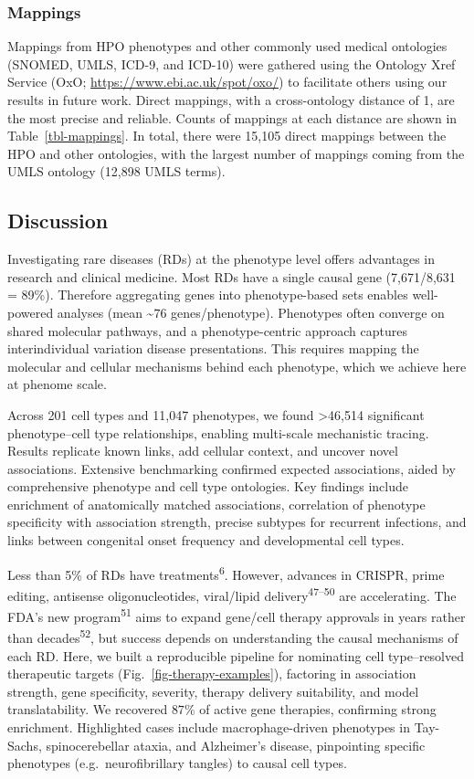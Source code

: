 \documentclass[
]{article}
\begin{document}
\subsubsection{Mappings}\label{mappings}

Mappings from HPO phenotypes and other commonly used medical ontologies
(SNOMED, UMLS, ICD-9, and ICD-10) were gathered using the Ontology Xref
Service (OxO; \url{https://www.ebi.ac.uk/spot/oxo/}) to facilitate
others using our results in future work. Direct mappings, with a
cross-ontology distance of 1, are the most precise and reliable. Counts
of mappings at each distance are shown in Table~\ref{tbl-mappings}. In
total, there were 15,105 direct mappings between the HPO and other
ontologies, with the largest number of mappings coming from the UMLS
ontology (12,898 UMLS terms).

\subsection{Discussion}\label{sec-discussion}

Investigating rare diseases (RDs) at the phenotype level offers
advantages in research and clinical medicine. Most RDs have a single
causal gene (7,671/8,631 = 89\%). Therefore aggregating genes into
phenotype-based sets enables well-powered analyses (mean
\textasciitilde{}\(76\) genes/phenotype). Phenotypes often converge on
shared molecular pathways, and a phenotype-centric approach captures
interindividual variation disease presentations. This requires mapping
the molecular and cellular mechanisms behind each phenotype, which we
achieve here at phenome scale.

Across 201 cell types and 11,047 phenotypes, we found \textgreater46,514
significant phenotype--cell type relationships, enabling multi-scale
mechanistic tracing. Results replicate known links, add cellular
context, and uncover novel associations. Extensive benchmarking
confirmed expected associations, aided by comprehensive phenotype and
cell type ontologies. Key findings include enrichment of anatomically
matched associations, correlation of phenotype specificity with
association strength, precise subtypes for recurrent infections, and
links between congenital onset frequency and developmental cell types.

Less than 5\% of RDs have treatments\textsuperscript{6}. However,
advances in CRISPR, prime editing, antisense oligonucleotides,
viral/lipid delivery\textsuperscript{47--50} are accelerating. The FDA's
new program\textsuperscript{51} aims to expand gene/cell therapy
approvals in years rather than decades\textsuperscript{52}, but success
depends on understanding the causal mechanisms of each RD. Here, we
built a reproducible pipeline for nominating cell type--resolved
therapeutic targets (Fig.~\ref{fig-therapy-examples}), factoring in
association strength, gene specificity, severity, therapy delivery
suitability, and model translatability. We recovered \(87\)\% of active
gene therapies, confirming strong enrichment. Highlighted cases include
macrophage-driven phenotypes in Tay-Sachs, spinocerebellar ataxia, and
Alzheimer's disease, pinpointing specific phenotypes
(e.g.~neurofibrillary tangles) to causal cell types.
\end{document}
